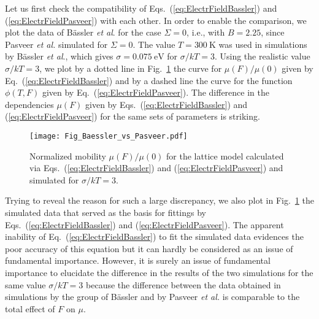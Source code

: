 \documentclass[aps,reprint,amsmath,amssymb,superscriptaddress,showpacs,prb]{revtex4-1}
\begin{document}
Let us first check the compatibility of Eqs.~(\ref{eq:ElectrFieldBassler}) and (\ref{eq:ElectrFieldPasveer}) with each other. In order to enable the comparison, we plot the data of B\"{a}ssler \textit{et al}. \cite{Borsenberger1991,Bassler1993} for the case $\Sigma = 0$, i.e., with $B=2.25$, since Pasveer \textit{et al.}\cite{Pasveer2005} simulated for $\Sigma = 0$. The value $T=\SI{300}{\kelvin}$ was used in simulations by B\"{a}ssler \textit{et al}., which gives $\sigma=\SI{0.075}{\electronvolt}$ for $\sigma/kT = 3$. Using the realistic value $\sigma/kT = 3$, we plot by a dotted line in Fig.~\ref{fig:Baessler_vs_Pasveer}  the curve for $\mu(F)/\mu(0)$ given by Eq.~(\ref{eq:ElectrFieldBassler}) and by a dashed line the curve for the function $\phi(T,F)$ given by Eq.~(\ref{eq:ElectrFieldPasveer}). The difference in the dependencies $\mu(F)$ given by Eqs.~(\ref{eq:ElectrFieldBassler}) and (\ref{eq:ElectrFieldPasveer}) for the same sets of parameters is striking.


\begin{figure}
	\texttt{[image: Fig\_Baessler\_vs\_Pasveer.pdf]}
	\caption{Normalized mobility $\mu(F)/\mu(0)$ for the lattice model calculated via Eqs.~(\ref{eq:ElectrFieldBassler}) and (\ref{eq:ElectrFieldPasveer}) and simulated for $\sigma/kT =3$.}
	\label{fig:Baessler_vs_Pasveer}
\end{figure}


Trying to reveal the reason for such a large discrepancy, we also plot in Fig.~\ref{fig:Baessler_vs_Pasveer} the simulated data \cite{Bassler1993,Pasveer2005} that served as the basis for fittings by Eqs.~(\ref{eq:ElectrFieldBassler}) and (\ref{eq:ElectrFieldPasveer}). The apparent inability of Eq.~(\ref{eq:ElectrFieldBassler}) to fit the simulated data evidences the poor accuracy of this equation but it can hardly be considered as an issue of fundamental importance. However, it is surely an issue of fundamental importance to elucidate the
difference in the results of the two simulations \cite{Bassler1993,Pasveer2005} for the same value $\sigma/kT = 3$ because the difference between the data obtained in simulations by the group of B\"{a}ssler\cite{Borsenberger1991,Bassler1993} and by Pasveer \textit{et al.}\cite{Pasveer2005}  is comparable to the total effect of $F$ on $\mu$.
\end{document}
